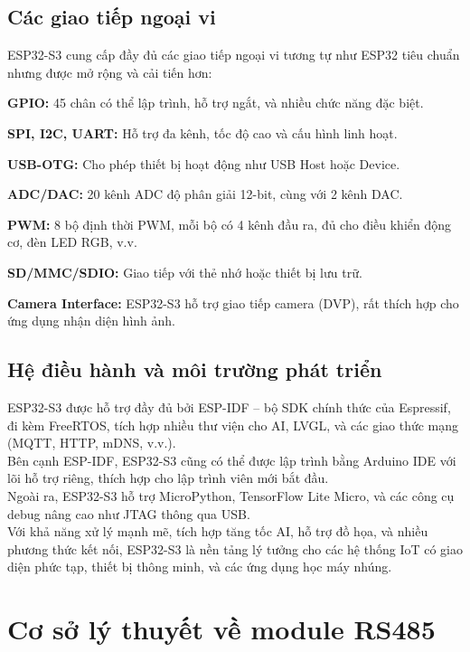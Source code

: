 \subsection{Các giao tiếp ngoại vi}
\tab ESP32-S3 cung cấp đầy đủ các giao tiếp ngoại vi tương tự như ESP32 tiêu chuẩn nhưng được mở rộng và cải tiến hơn:

\textbf{GPIO:} 45 chân có thể lập trình, hỗ trợ ngắt, và nhiều chức năng đặc biệt.

\textbf{SPI, I2C, UART:} Hỗ trợ đa kênh, tốc độ cao và cấu hình linh hoạt.

\textbf{USB-OTG:} Cho phép thiết bị hoạt động như USB Host hoặc Device.

\textbf{ADC/DAC:} 20 kênh ADC độ phân giải 12-bit, cùng với 2 kênh DAC.

\textbf{PWM:} 8 bộ định thời PWM, mỗi bộ có 4 kênh đầu ra, đủ cho điều khiển động cơ, đèn LED RGB, v.v.

\textbf{SD/MMC/SDIO:} Giao tiếp với thẻ nhớ hoặc thiết bị lưu trữ.

\textbf{Camera Interface:} ESP32-S3 hỗ trợ giao tiếp camera (DVP), rất thích hợp cho ứng dụng nhận diện hình ảnh.

\subsection{Hệ điều hành và môi trường phát triển}
\tab ESP32-S3 được hỗ trợ đầy đủ bởi ESP-IDF – bộ SDK chính thức của Espressif, đi kèm FreeRTOS, tích hợp nhiều thư viện cho AI, LVGL, và các giao thức mạng (MQTT, HTTP, mDNS, v.v.).\\
\tab Bên cạnh ESP-IDF, ESP32-S3 cũng có thể được lập trình bằng Arduino IDE với lõi hỗ trợ riêng, thích hợp cho lập trình viên mới bắt đầu.\\
\tab Ngoài ra, ESP32-S3 hỗ trợ MicroPython, TensorFlow Lite Micro, và các công cụ debug nâng cao như JTAG thông qua USB.\\
\tab Với khả năng xử lý mạnh mẽ, tích hợp tăng tốc AI, hỗ trợ đồ họa, và nhiều phương thức kết nối, ESP32-S3 là nền tảng lý tưởng cho các hệ thống IoT có giao diện phức tạp, thiết bị thông minh, và các ứng dụng học máy nhúng.
\section{Cơ sở lý thuyết về module RS485}

